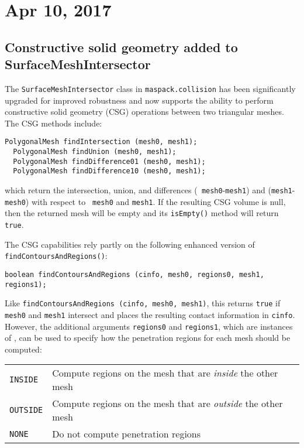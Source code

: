 \documentclass{article}
\begin{document}
\section*{Apr 10, 2017}

\subsection*{Constructive solid geometry added to SurfaceMeshIntersector}

The {\tt SurfaceMeshIntersector} class in {\tt maspack.collision} has
been significantly upgraded for improved robustness and now supports
the ability to perform constructive solid geometry (CSG) operations
between two triangular meshes. The CSG methods include:
%
\begin{lstlisting}[]
  PolygonalMesh findIntersection (mesh0, mesh1);
  PolygonalMesh findUnion (mesh0, mesh1);
  PolygonalMesh findDifference01 (mesh0, mesh1);
  PolygonalMesh findDifference10 (mesh0, mesh1);
\end{lstlisting}
%
which return the intersection, union, and differences ({\tt
mesh0}-{\tt mesh1}) and ({\tt mesh1}-{\tt mesh0}) with respect to {\tt
mesh0} and {\tt mesh1}. If the resulting CSG volume is null, then the
returned mesh will be empty and its {\tt isEmpty()} method will return
{\tt true}.

The CSG capabilities rely partly on the following enhanced version of
{\tt findContoursAndRegions()}:
%
\begin{lstlisting}[]
  boolean findContoursAndRegions (cinfo, mesh0, regions0, mesh1, regions1);
\end{lstlisting}
%
Like {\tt findContoursAndRegions (cinfo, mesh0, mesh1)}, this returns
{\tt true} if {\tt mesh0} and {\tt mesh1} intersect and places the
resulting contact information in {\tt cinfo}. However, the additional
arguments {\tt regions0} and {\tt regions1}, which are instances of
, can
be used to specify how the penetration regions for each mesh should be
computed:

\begin{tabular}{lll}
\hline
{\tt INSIDE} & 
Compute regions on the mesh that are {\it inside} the other mesh\\
{\tt OUTSIDE} & 
Compute regions on the mesh that are {\it outside} the other mesh\\
{\tt NONE} & 
Do not compute penetration regions\\
\hline
\end{tabular}
\end{document}
